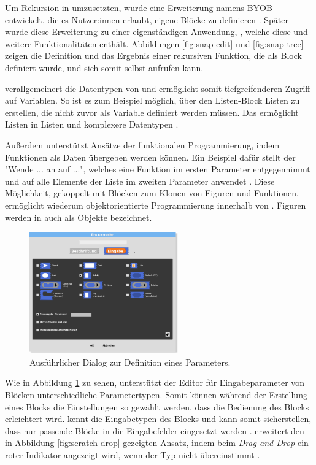 Um Rekursion in \Scratch{} umzusetzten, wurde eine Erweiterung namens \ac{BYOB} entwickelt, die es Nutzer:innen erlaubt, eigene Blöcke zu definieren \parencite{harveyBringingNo2010}. Später wurde diese Erweiterung zu einer eigenständigen Anwendung, \Snap{}, welche diese und weitere Funktionalitäten enthält. Abbildungen \ref{fig:snap-edit} und \ref{fig:snap-tree} zeigen die Definition und das Ergebnis einer rekursiven Funktion, die als Block definiert wurde, und sich somit selbst aufrufen kann.

\Snap{} verallgemeinert die Datentypen von \Scratch{} und ermöglicht somit tiefgreifenderen Zugriff auf Variablen. So ist es zum Beispiel möglich, über den Listen-Block Listen zu erstellen, die nicht zuvor als Variable definiert werden müssen. Das ermöglicht Listen in Listen und komplexere Datentypen \parencite{harveySnapReference2020}.

Außerdem unterstützt \Snap{} Ansätze der funktionalen Programmierung, indem Funktionen als Daten übergeben werden können. Ein Beispiel dafür stellt der "Wende ... an auf ...", welches eine Funktion im ersten Parameter entgegennimmt und auf alle Elemente der Liste im zweiten Parameter anwendet \parencite{harveySnapReference2020}. Diese Möglichkeit, gekoppelt mit Blöcken zum Klonen von Figuren und Funktionen, ermöglicht wiederum objektorientierte Programmierung innerhalb von \Snap{} \parencite{harveySnapReference2020}. Figuren werden in \Snap{} auch als Objekte bezeichnet.

\begin{figure}
  \centering
    \includegraphics[width=0.57\textwidth]{assets/snap-input-types.png}
  \caption{Ausführlicher Dialog zur Definition eines Parameters.}
  \label{fig:snap-input-types}
\end{figure}

Wie in Abbildung \ref{fig:snap-input-types} zu sehen, unterstützt der Editor für Eingabeparameter von Blöcken unterschiedliche Parametertypen. Somit können während der Erstellung eines Blocks die Einstellungen so gewählt werden, dass die Bedienung des Blocks erleichtert wird. \Snap{} kennt die Eingabetypen des Blocks und kann somit sicherstellen, dass nur passende Blöcke in die Eingabefelder eingesetzt werden \parencite{harveySnapReference2020}. \Snap{} erweitert den in Abbildung \ref{fig:scratch-drop} gezeigten Ansatz, indem beim \textit{Drag and Drop} ein roter Indikator angezeigt wird, wenn der Typ nicht übereinstimmt \parencite{harveySnapReference2020}.


